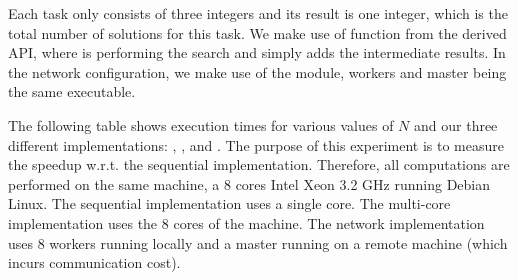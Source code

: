 \documentclass[tfpsymp,pagenumbers]{tfp07symp}
\begin{document}
Each task only consists of three integers and its result is one integer,
which is the total number of solutions for this task.
We make use of function  from the derived API,
where  is performing the search and  simply adds the
intermediate results.
In the network configuration, we make use of the 
module, workers and master being the same executable.

The following table shows execution times for various values of $N$
and our three different implementations: , , and
. The purpose of this experiment is to measure the speedup
w.r.t. the sequential implementation. Therefore, all
computations are performed on the same machine, a 8 cores Intel Xeon
3.2 GHz running Debian Linux. The sequential implementation uses a
single core. The multi-core implementation uses the 8 cores of
the machine. The network implementation uses 8 workers running locally and
a master running on a remote machine (which incurs communication cost).
\end{document}
